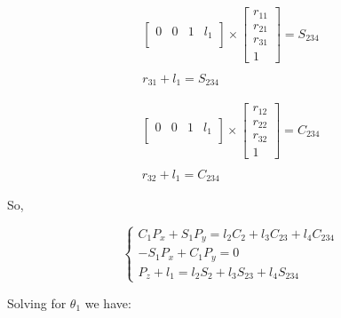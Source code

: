 \documentclass[transmag]{IEEEtran}
\begin{document}
\begin{equation}
\begin{matrix}
\begin{bmatrix}
0  & 0   & 1 & l_1   \\
\end{bmatrix}
\times
\begin{bmatrix}
r_{11} \\
r_{21} \\
r_{31} \\
1
\end{bmatrix}
= S_{234} \\
\\
r_{31} + l_1= S_{234}
\end{matrix}
\end{equation}

\begin{equation}
\begin{matrix}
\begin{bmatrix}
0  & 0   & 1 & l_1   \\
\end{bmatrix}
\times
\begin{bmatrix}
r_{12} \\
r_{22} \\
r_{32} \\
1
\end{bmatrix}
= C_{234} \\
\\
r_{32} + l_1= C_{234}
\end{matrix}
\end{equation}

So,

\begin{equation}
\begin{cases}
C_1 P_x + S_1 P_y = l_2 C_2 + l_3 C_{23} + l_4 C_{234} \\
-S_1 P_x + C_1 P_y = 0 \\
P_z + l_1 = l_2 S_2 + l_3 S_{23} + l_4 S_{234}
\end{cases}
\end{equation}


Solving for $\theta_1$ we have:
\end{document}
